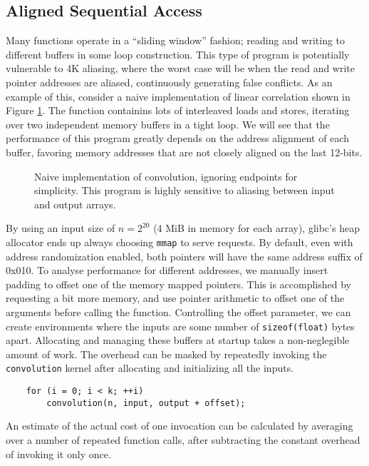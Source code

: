 \documentclass[prodmode,acmtaco]{acmsmall}
\begin{document}
{\subsection{Aligned Sequential Access}
Many functions operate in a ``sliding window'' fashion; reading and writing to different buffers in some loop construction.
This type of program is potentially vulnerable to 4K aliasing, where the worst case will be when the read and write pointer addresses are aliased, continuously generating false conflicts.
As an example of this, consider a naive implementation of linear correlation shown in Figure \ref{lst:conv}.
The function containins lots of interleaved loads and stores, iterating over two independent memory buffers in a tight loop.
We will see that the performance of this program greatly depends on the address alignment of each buffer, favoring memory addresses that are not closely aligned on the last 12-bits.

\begin{figure}[t]
  \centering
  
  \caption{Naive implementation of convolution, ignoring endpoints for simplicity. This program is highly sensitive to aliasing between input and output arrays.}
  \label{lst:conv}
\end{figure}

By using an input size of $n=2^{20}$ (4 MiB in memory for each array), glibc's heap allocator ends up always choosing \texttt{mmap} to serve requests.
By default, even with address randomization enabled, both pointers will have the same address suffix of 0x010.
To analyse performance for different addresses, we manually insert padding to offset one of the memory mapped pointers.
This is accomplished by requesting a bit more memory, and use pointer arithmetic to offset one of the arguments before calling the function.
Controlling the offset parameter, we can create environments where the inputs are some number of \texttt{sizeof(float)} bytes apart.
Allocating and managing these buffers at startup takes a non-neglegible amount of work.
The overhead can be masked by repeatedly invoking the \texttt{convolution} kernel after allocating and initializing all the inputs.
\begin{lstlisting}
    for (i = 0; i < k; ++i)
        convolution(n, input, output + offset);
\end{lstlisting}
An estimate of the actual cost of one invocation can be calculated by averaging over a number of repeated function calls, after subtracting the constant overhead of invoking it only once.

}
\end{document}
